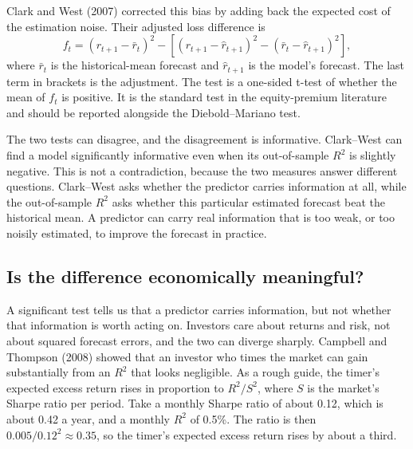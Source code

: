 Clark and West (2007) corrected this bias by adding back the expected cost of the estimation noise. Their adjusted loss difference is
\begin{equation}
  f_t = (r_{t+1} - \bar r_t)^2 - \left[(r_{t+1} - \hat r_{t+1})^2 - (\bar r_t - \hat r_{t+1})^2\right],
  \label{eq:05-cw}
\end{equation}
where $\bar r_t$ is the historical-mean forecast and $\hat r_{t+1}$ is the model's forecast. The last term in brackets is the adjustment. The test is a one-sided t-test of whether the mean of $f_t$ is positive. It is the standard test in the equity-premium literature and should be reported alongside the Diebold--Mariano test.

The two tests can disagree, and the disagreement is informative. Clark--West can find a model significantly informative even when its out-of-sample $R^2$ is slightly negative. This is not a contradiction, because the two measures answer different questions. Clark--West asks whether the predictor carries information at all, while the out-of-sample $R^2$ asks whether this particular estimated forecast beat the historical mean. A predictor can carry real information that is too weak, or too noisily estimated, to improve the forecast in practice.

\subsection{Is the difference economically meaningful?}

A significant test tells us that a predictor carries information, but not whether that information is worth acting on. Investors care about returns and risk, not about squared forecast errors, and the two can diverge sharply. Campbell and Thompson (2008) showed that an investor who times the market can gain substantially from an $R^2$ that looks negligible. As a rough guide, the timer's expected excess return rises in proportion to $R^2/S^2$, where $S$ is the market's Sharpe ratio per period. Take a monthly Sharpe ratio of about 0.12, which is about 0.42 a year, and a monthly $R^2$ of 0.5\%. The ratio is then $0.005/0.12^2 \approx 0.35$, so the timer's expected excess return rises by about a third.

